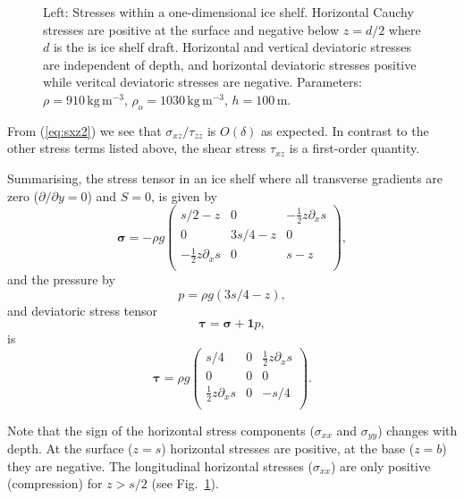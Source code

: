 \documentclass[10pt,a4paper]{book}
\newcommand{\de}{\delta}
\newcommand{\tzz}{\tau_{zz}}
\newcommand{\txz}{\tau_{xz}}
\newcommand{\sxz}{\sigma_{xz}}
\begin{document}
\begin{figure}
\begin{subfigure}{0.5\textwidth}
\end{subfigure}
\caption{\label{fig:stresses}Left: Stresses within a one-dimensional
  ice shelf. Horizontal Cauchy stresses are positive at the surface
  and negative below $z=d/2$ where $d$ is the is ice shelf
  draft. Horizontal and vertical deviatoric stresses are independent
  of depth, and horizontal deviatoric stresses positive while veritcal
  deviatoric stresses are negative. Parameters:
  $\rho=910 \, \mathrm{kg\, m^{-3}}$,
  $\rho_o=1030 \, \mathrm{kg \, m^{-3}}$, $h= 100 \, \mathrm{m}$.}
\end{figure}


From (\ref{eq:sxz2}) we see that $\sxz/\tzz$ is $O(\de)$ as
expected. In contrast to the other stress terms listed above, the
shear stress $\txz$ is a first-order quantity.

Summarising, the stress tensor in an ice shelf where all transverse gradients are zero
($\partial/\partial y=0$) and $S=0$, is given by
\begin{equation}
 \bm{\sigma}= -\rho g \left ( \begin{array}{ccc} 
s/2-z & 0  & -\frac{1}{2} z \partial_x s \\
 0  & 3 s/4-z &  0 \\
 -\frac{1}{2} z \partial_x s & 0 & s-z \\ 
 \end{array} \right ),
\label{eq:shelfstresses}
 \end{equation}
and the pressure by
\[ p=\rho g (3 s/4 -z) ,
\]
and deviatoric stress tensor
\[
\bm{\tau}=\bm{\sigma}+ \bm{1} p,
\]
is 
\begin{equation}
 \bm{\tau}= \rho g \left ( \begin{array}{ccc} 
    s/4 & 0  & \frac{1}{2} z \partial_x s \\
 0  & 0 &  0 \\
 \frac{1}{2} z \partial_x s & 0 & -s/4 \\ 
 \end{array} \right ).
\label{eq:shelfdevstresses}
 \end{equation}



 Note that the sign of the horizontal stress components ($\sigma_{xx}$
 and $\sigma_{yy}$) changes with depth. At the surface ($z=s$)
 horizontal stresses are positive, at the base ($z=b$) they are
 negative. The longitudinal horizontal stresses ($\sigma_{xx}$) are
 only positive (compression) for $z>s/2$ (see
 Fig.~\ref{fig:stresses}).
\end{document}
